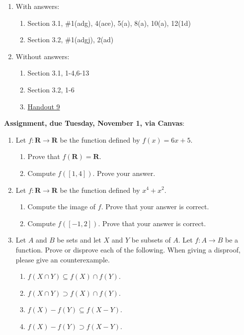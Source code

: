 \documentclass[12pt]{article}
\begin{document}
\begin{enumerate}
\item With answers:
  \begin{enumerate}
\item Section 3.1, \#1(adg), 4(ace), 5(a), 8(a), 10(a), 12(1d)
\item Section 3.2, \#1(adgj), 2(ad)
\end{enumerate}  
\item Without answers:
  \begin{enumerate}
\item Section 3.1, 1-4,6-13
\item Section 3.2, 1-6
\item \href{https://www.math.emory.edu/~dzb/teaching/250Fall2021/handouts/250-H09-images.pdf}{Handout 9}
  \end{enumerate}    
\end{enumerate}


\noindent \textbf{Assignment, due Tuesday, November 1, via Canvas}:
\begin{enumerate}

\item Let $f \colon \mathbf{R} \to \mathbf{R}$ be the function defined by $f(x) = 6x+5$.
 \begin{enumerate}
 \item Prove that $f(\mathbf{R}) = \mathbf{R}$.
 \item Compute $f([1,4])$. Prove your answer.
 \end{enumerate}
\item Let $f \colon \mathbf{R} \to \mathbf{R}$ be the function defined by $x^4 + x^2$. 
 \begin{enumerate}
 \item Compute the image of $f$. Prove that your answer is correct.
 \item Compute $f([-1,2])$. Prove that your answer is correct.
\end{enumerate}

\item Let $A$ and $B$ be sets and let $X$ and $Y$ be subsets of $A$. Let $f\colon A \to B$ be a function. Prove or disprove each of the following. When giving a disproof, please give an counterexample.
 \begin{enumerate}

  \item $f(X \cap Y) \subseteq f(X) \cap f(Y)$.
  \item $f(X \cap Y) \supset f(X) \cap f(Y)$.
  \item $f(X) - f(Y) \subseteq f(X - Y)$.
  \item $f(X) - f(Y) \supset f(X - Y)$.

 \end{enumerate}

 

\end{enumerate}
\end{document}
